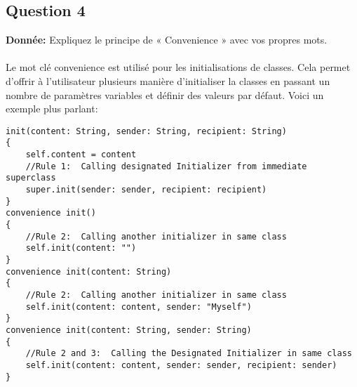\subsection{Question 4}
\textbf{Donnée: }Expliquez le principe de « Convenience » avec vos propres mots.\\\\
Le mot clé convenience est utilisé pour les initialisations de classes. Cela permet d'offrir à l'utilisateur plusieurs manière d'initialiser la classes en passant un nombre de paramètres variables et définir des valeurs par défaut. Voici un exemple plus parlant:
\begin{lstlisting}
init(content: String, sender: String, recipient: String)
{
	self.content = content
	//Rule 1:  Calling designated Initializer from immediate superclass
	super.init(sender: sender, recipient: recipient)
}
convenience init()
{
	//Rule 2:  Calling another initializer in same class
	self.init(content: "")
}
convenience init(content: String)
{
	//Rule 2:  Calling another initializer in same class
	self.init(content: content, sender: "Myself")
}
convenience init(content: String, sender: String)
{
	//Rule 2 and 3:  Calling the Designated Initializer in same class
	self.init(content: content, sender: sender, recipient: sender)
}
\end{lstlisting}